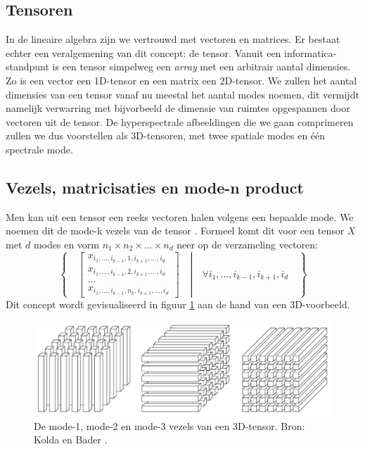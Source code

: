 \subsection{Tensoren}

In de lineaire algebra zijn we vertrouwd met vectoren en matrices. Er bestaat echter een veralgemening van dit concept: de tensor. Vanuit een informatica-standpunt is een tensor simpelweg een \textit{array} met een arbitrair aantal dimensies. Zo is een vector een 1D-tensor en een matrix een 2D-tensor. We zullen het aantal dimensies van een tensor vanaf nu meestal het aantal modes noemen, dit vermijdt namelijk verwarring met bijvorbeeld de dimensie van ruimtes opgespannen door vectoren uit de tensor. De hyperspectrale afbeeldingen die we gaan comprimeren zullen we dus voorstellen als 3D-tensoren, met twee spatiale modes en \'e\'en spectrale mode.

\subsection{Vezels, matricisaties en mode-n product}

Men kan uit een tensor een reeks vectoren halen volgens een bepaalde mode. We noemen dit de mode-k vezels van de tensor \cite{ref:kolda}. Formeel komt dit voor een tensor $X$ met $d$ modes en vorm $n_1 \times n_2 \times \dots \times n_d$ neer op de verzameling vectoren:
\[
\left\{
\quad
\left.
\begin{bmatrix}
x_{i_1, \dots, i_{k-1}, 1, i_{k+1}, \dots, i_d} \\
x_{i_1, \dots, i_{k-1}, 2, i_{k+1}, \dots, i_d} \\
\dots \\
x_{i_1, \dots, i_{k-1}, n_k, i_{k+1}, \dots, i_d}
\end{bmatrix}
\quad
\right\vert
\quad
\forall i_1, \dots, i_{k-1}, i_{k+1}, i_d
\quad
\right\}
\]
Dit concept wordt gevisualiseerd in figuur \ref{fig:fibers} aan de hand van een 3D-voorbeeld.

\begin{figure}[H]
  \centering
  \includegraphics[scale=0.2]{images/fibers.png}
  \caption{De mode-1, mode-2 en mode-3 vezels van een 3D-tensor. Bron: Kolda en Bader \cite{ref:kolda}.}
\label{fig:fibers}
\end{figure}

